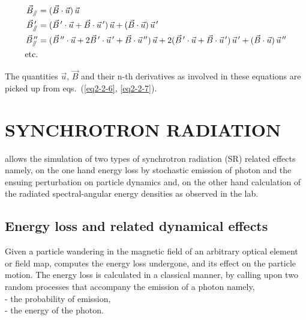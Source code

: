 \begin{equation}
	\begin{aligned}
		\vec  B_{\mathrel{/\kern-.25em/}} 
		     & = (\vec  B \cdot\vec  u)\, \vec  u \\
		\vec  B^{\,\prime}_{\mathrel{/\kern-.25em/}}  
		     & = (\vec B^{\,\prime} \cdot\vec  u+\vec  B\cdot\vec  u^{\,\prime} )\,\vec  u
		       +(\vec  B\cdot\vec  u)\,\vec u^{\,\prime} \\
		\vec B^{\,\prime\prime}_{\mathrel{/\kern-.25em/}}  
		     & = (\vec  B^{\,\prime\prime} \cdot\vec  u+2\vec B^{\,\prime} \cdot\vec  u^{\,\prime} 
		       +\vec  B\cdot\vec  u^{\,\prime\prime} )\, \vec  u
		       +2(\vec B^{\,\prime} \cdot\vec  u+\vec  B\cdot\vec  u^{\,\prime} )\,\vec  u^{\,\prime} 
		       +(\vec  B\cdot\vec u)\,\vec  u^{\,\prime\prime}\\
		\text{etc.}
	\end{aligned}
	\label{eq3-7}
\end{equation}


\noindent The quantities $ \vec  u$,  $ \vec  B $ and their n-th derivatives
as involved in these equations are picked up from eqs.~(\ref{eq2-2-6}, \ref{eq2-2-7}).



\clearemptydoublepage

\section{SYNCHROTRON RADIATION }\label{secN4} 

\renewcommand\theequation{\thesubsection.\arabic{equation}}
\makeatletter
{}
\makeatother

\zgoubi allows the simulation of two types of synchrotron radiation (SR) related effects 
 namely, on the one hand 
energy loss by stochastic emission of photon and the ensuing perturbation 
on particle dynamics  and, on the other hand calculation of the 
radiated spectral-angular energy densities as observed in the lab. 

\subsection{Energy loss and related dynamical effects~\protect\cite{FMSEA-00-01}}\label{secSRLoss}

Given a particle wandering in the magnetic field of an arbitrary optical element or field 
map, \zgoubi computes the energy loss undergone, and its 
effect on the particle motion. The energy loss is calculated  in a  classical manner, by calling upon 
two random processes that accompany the emission of a photon  namely, \\
\indent - the probability of emission, \\
\indent - the energy of the photon. 

